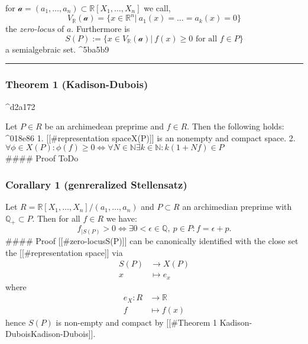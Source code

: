 \documentclass[
]{article}
\begin{document}
for \(\mathcal a = (a_1,\dots,a_n) \subset \mathbb R [X_1,\dots,X_n]\)
we call,
\[ V_\mathbb R(\mathcal a) = \lbrace x \in \mathbb R^n\vert \ a_1(x) = \dots = a_k(x) = 0 \rbrace\]
the \emph{zero-locus} of \(a\). Furthermore is
\[ S(P) := \lbrace x \in V_\mathbb R(\mathcal a) \vert \ f(x) \geq 0 \text{ for all } f \in P \rbrace\]
a semialgebraic set. \^{}5ba5b9

\begin{center}\rule{0.5\linewidth}{0.5pt}\end{center}

\hypertarget{theorem-1-kadison-dubois}{%
\subsubsection{Theorem 1
(Kadison-Dubois)}\label{theorem-1-kadison-dubois}}

\^{}d2a172

Let \(P \in R\) be an archimedean preprime and \(f \in R\). Then the
following holds: \^{}018e86 1. {[}{[}\#representation
space\textbar X(P){]}{]} is an nonempty and compact space. 2.
\(\forall \phi \in X(P): \phi(f) \geq 0 \Leftrightarrow \forall N \in \mathbb N \exists k \in \mathbb N: k(1+Nf) \in P\)\\
\#\#\#\# Proof ToDo

\hypertarget{corallary-1-genreralized-stellensatz}{%
\subsubsection{Corallary 1 (genreralized
Stellensatz)}\label{corallary-1-genreralized-stellensatz}}

Let \(R = \mathbb R [X_1,\dots, X_n] /(a_1,\dots,a_n)\) and
\(P \subset R\) an archimedian preprime with \(\mathbb Q_+ \subset P\).
Then for all \(f \in R\) we have:
\[ f_{\vert S(P)}> 0 \Leftrightarrow \exists 0 < \epsilon \in \mathbb Q, \ p\in P: f = \epsilon +p.\]
\#\#\#\# Proof {[}{[}\#zero-locus\textbar S(P){]}{]} can be canonically
identified with the close set the {[}{[}\#representation space{]}{]} via
\[\begin{aligned}S(P) &\rightarrow X(P) \\ x &\mapsto e_x  \end{aligned}\]
where
\[\begin{aligned} e_X: R &\rightarrow \mathbb R \\ f &\mapsto f(x)\end{aligned}\]
hence \(S(P)\) is non-empty and compact by {[}{[}\#Theorem 1
Kadison-Dubois\textbar Kadison-Dubois{]}{]}.
\end{document}
